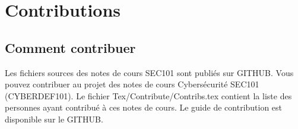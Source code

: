 
\section{Contributions}

\subsection{Comment contribuer}

Les fichiers sources des notes de cours  SEC101 sont publiés sur GITHUB. Vous pouvez contribuer au projet des notes de cours Cybersécurité SEC101 (CYBERDEF101). Le fichier Tex/Contribute/Contribs.tex contient la liste des personnes ayant contribué à ces notes de cours.
Le guide de contribution est disponible sur le GITHUB.

